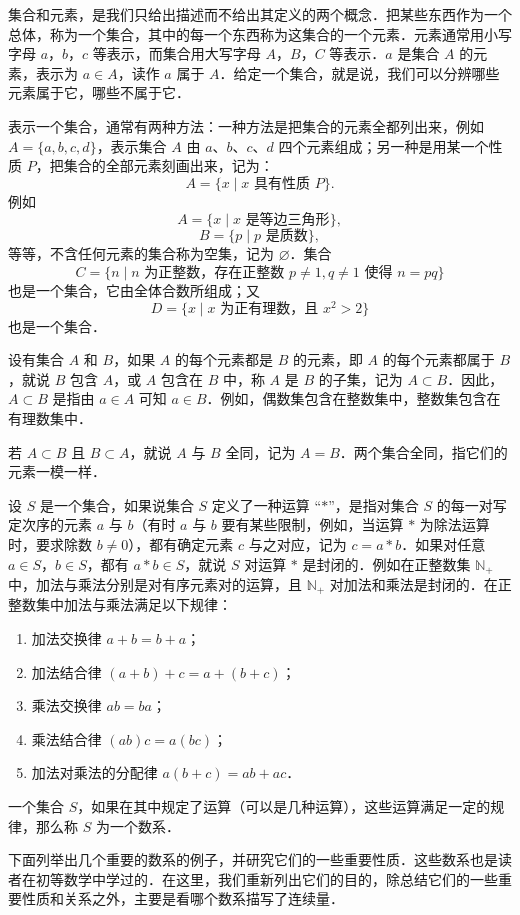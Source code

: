 集合和元素，是我们只给出描述而不给出其定义的两个概念．把某些东西作为一个总体，称为一个集合，其中的每一个东西称为这集合的一个元素．元素通常用小写字母 $a$，$b$，$c$ 等表示，而集合用大写字母 $A$，$B$，$C$ 等表示．$a$ 是集合 $A$ 的元素，表示为 $a \in A$，读作 $a$ 属于 $A$．给定一个集合，就是说，我们可以分辨哪些元素属于它，哪些不属于它．

表示一个集合，通常有两种方法：一种方法是把集合的元素全都列出来，例如 $A=\{a,b,c,d\}$，表示集合 $A$ 由 $a$、$b$、$c$、$d$ 四个元素组成；另一种是用某一个性质 $P$，把集合的全部元素刻画出来，记为：
\[
A=\{x\mid x \text{ 具有性质 } P\}.
\]
例如
\[
A=\{x\mid x \text{ 是等边三角形}\},
\]
\[
B=\{p\mid p \text{ 是质数}\},
\]
等等，不含任何元素的集合称为空集，记为 $\varnothing$．集合
\[
C=\{n\mid n \text{ 为正整数，存在正整数 } p\neq 1, q\neq 1 \text{ 使得 } n=pq\}
\]
也是一个集合，它由全体合数所组成；又
\[
D=\{x\mid x \text{ 为正有理数，且 } x^2>2\}
\]
也是一个集合．

设有集合 $A$ 和 $B$，如果 $A$ 的每个元素都是 $B$ 的元素，即 $A$ 的每个元素都属于 $B$，就说 $B$ 包含 $A$，或 $A$ 包含在 $B$ 中，称 $A$ 是 $B$ 的子集，记为 $A\subset B$．因此，$A\subset B$ 是指由 $a\in A$ 可知 $a\in B$．例如，偶数集包含在整数集中，整数集包含在有理数集中．

若 $A\subset B$ 且 $B\subset A$，就说 $A$ 与 $B$ 全同，记为 $A=B$．两个集合全同，指它们的元素一模一样．

设 $S$ 是一个集合，如果说集合 $S$ 定义了一种运算 ``$*$''，是指对集合 $S$ 的每一对写定次序的元素 $a$ 与 $b$（有时 $a$ 与 $b$ 要有某些限制，例如，当运算 $*$ 为除法运算时，要求除数 $b\neq 0$），都有确定元素 $c$ 与之对应，记为 $c = a * b$．如果对任意 $a\in S$，$b\in S$，都有 $a * b \in S$，就说 $S$ 对运算 $*$ 是封闭的．例如在正整数集 $\mathbb{N}_+$ 中，加法与乘法分别是对有序元素对的运算，且 $\mathbb{N}_+$ 对加法和乘法是封闭的．在正整数集中加法与乘法满足以下规律：
\begin{enumerate}[label=(\Roman*)]
  \item 加法交换律 $a+b=b+a$；
  \item 加法结合律 $(a+b)+c=a+(b+c)$；
  \item 乘法交换律 $ab=ba$；
  \item 乘法结合律 $(ab)c=a(bc)$；
  \item 加法对乘法的分配律 $a(b+c)=ab+ac$．
\end{enumerate}

一个集合 $S$，如果在其中规定了运算（可以是几种运算），这些运算满足一定的规律，那么称 $S$ 为一个数系．

下面列举出几个重要的数系的例子，并研究它们的一些重要性质．这些数系也是读者在初等数学中学过的．在这里，我们重新列出它们的目的，除总结它们的一些重要性质和关系之外，主要是看哪个数系描写了连续量．


